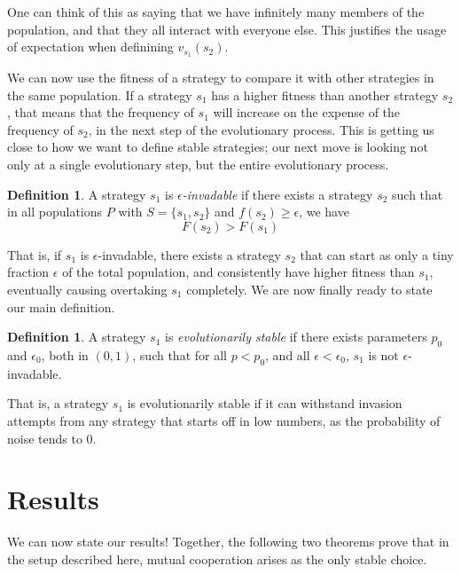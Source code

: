 \documentclass[11pt]{amsart}
\theoremstyle{definition}
\newtheorem{definition}[theorem]{Definition}
\theoremstyle{remark}
\begin{document}
One can think of this as saying that we have infinitely many members of the population, and that they all interact with everyone else. This justifies the usage of expectation when definining $v_{s_1}(s_2)$.

We can now use the fitness of a strategy to compare it with other strategies in the same population. If a strategy $s_1$ has a higher fitness than another strategy $s_2$, that means that the frequency of $s_1$ will increase on the expense of the frequency of $s_2$, in the next step of the evolutionary process. This is getting us close to how we want to define stable strategies; our next move is looking not only at a single evolutionary step, but the entire evolutionary process.

\begin{definition}
  A strategy $s_1$ is \textit{$\epsilon$-invadable} if there exists a strategy $s_2$ such that in all populations $P$ with $S = \{s_1,s_2\}$ and $f(s_2) \geq \epsilon$, we have 
  \begin{equation*}
    \label{fitnesscond}
    F(s_2) > F(s_1)
  \end{equation*}
\end{definition}

That is, if $s_1$ is $\epsilon$-invadable, there exists a strategy $s_2$ that can start as only a tiny fraction $\epsilon$ of the total population, and consistently have higher fitness than $s_1$, eventually causing overtaking $s_1$ completely. We are now finally ready to state our main definition.

\begin{definition}
  A strategy $s_1$ is \textit{evolutionarily stable} if there exists parameters $p_0$ and $\epsilon_0$, both in $(0,1)$, such that for all $p < p_0$, and all $\epsilon < \epsilon_0$, $s_1$ is not $\epsilon$-invadable.
\end{definition}

That is, a strategy $s_1$ is evolutionarily stable if it can withstand invasion attempts from any strategy that starts off in low numbers, as the probability of noise tends to 0. 

\section{Results}
\label{sectionresults}

We can now state our results! Together, the following two theorems prove that in the setup described here, mutual cooperation arises as the only stable choice.
\end{document}
